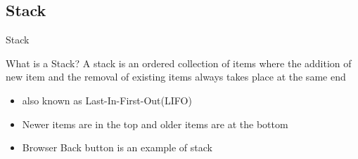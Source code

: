 \documentclass{beamer}
\begin{document}
\subsection{Stack}
\begin{frame}{Stack}
    \begin{alertblock}{What is a Stack?}
        A \alert{stack} is an ordered collection of items where the addition of new item and the removal of existing items always takes place at the same end 
    \end{alertblock}
    \begin{itemize}
        \item also known as \alert{Last-In-First-Out(LIFO)}
        \item Newer items are in the top and older items are at the bottom
        \item Browser \alert{Back} button is an example of stack
    \end{itemize}
\end{frame}
\end{document}
